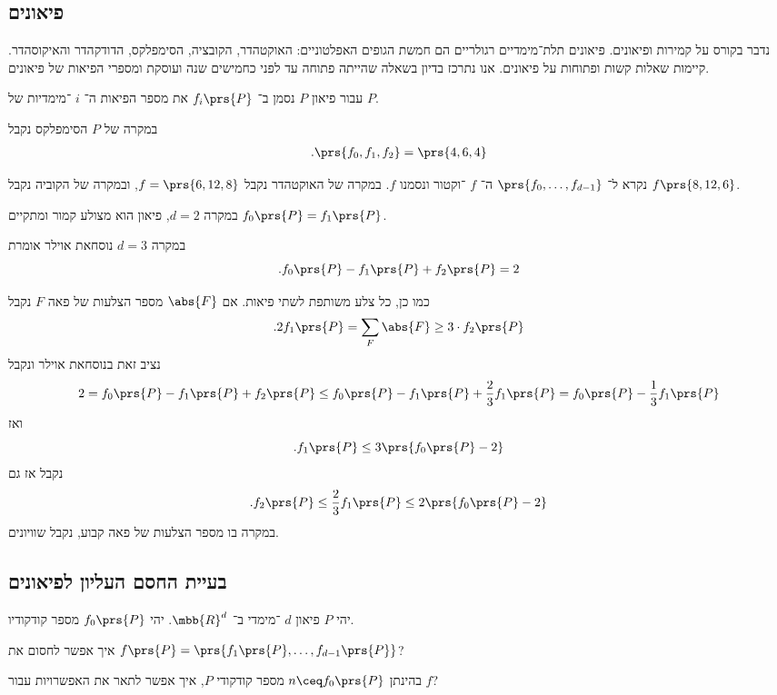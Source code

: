 \documentclass[a4paper,10pt,twoside,openany]{book}
\begin{document}
\subsection{פיאונים}

נדבר בקורס על קמירות ופיאונים.
פיאונים תלת־מימדיים רגולריים הם חמשת הגופים האפלטוניים: האוקטהדר, הקובציה, הסימפלקס, הדודקהדר והאיקוסהדר.
קיימות שאלות קשות ופתוחות על פיאונים. אנו נתרכז בדיון בשאלה שהייתה פתוחה עד לפני כחמישים שנה ועוסקת ומספרי הפיאות של פיאונים.

עבור פיאון
$P$
נסמן ב־%
$f_i\prs{P}$
את מספר הפיאות ה־%
$i$%
־מימדיות של
$P$.

במקרה של
$P$
הסימפלקס נקבל
\begin{align*}
\text{.} \prs{f_0, f_1, f_2} = \prs{4,6,4}
\end{align*}

נקרא ל־%
$\prs{f_0, \ldots, f_{d-1}}$
ה־%
$f$%
־וקטור ונסמנו
$f$.
במקרה של האוקטהדר נקבל
$f = \prs{6,12,8}$,
ובמקרה של הקוביה נקבל
$f\prs{8,12,6}$.

במקרה
$d = 2$,
פיאון הוא מצולע קמור ומתקיים
$f_0\prs{P} = f_1\prs{P}$.

במקרה
$d = 3$
נוסחאת אוילר אומרת
\[\text{.} f_0\prs{P} - f_1\prs{P} + f_2\prs{P} = 2\]

כמו כן, כל צלע משותפת לשתי פיאות. אם
$\abs{F}$
מספר הצלעות של פאה
$F$
נקבל
\begin{align*}
\text{.} 2 f_1\prs{P} = \sum_{F} \abs{F} \geq 3 \cdot f_2\prs{P}
\end{align*}
נציב זאת בנוסחאת אוילר ונקבל
\[2 = f_0\prs{P} - f_1\prs{P} + f_2\prs{P} \leq f_0\prs{P} - f_1\prs{P} + \frac{2}{3} f_1\prs{P} = f_0\prs{P} - \frac{1}{3} f_1\prs{P}\]
ואז
\[\text{.} f_1\prs{P} \leq 3 \prs{f_0\prs{P} - 2}\]
נקבל אז גם
\[\text{.} f_2\prs{P} \leq \frac{2}{3} f_1\prs{P} \leq 2 \prs{f_0\prs{P} - 2}\]
במקרה בו מספר הצלעות של פאה קבוע, נקבל שוויונים.

\subsection{בעיית החסם העליון לפיאונים}

יהי
$P$
פיאון
$d$%
־מימדי ב־%
$\mbb{R}^d$.
יהי
$f_0\prs{P}$
מספר קודקודיו.

\begin{question}
איך אפשר לחסום את
$f\prs{P} = \prs{f_1\prs{P}, \ldots, f_{d-1}\prs{P}}$?
\end{question}

\begin{question}
בהינתן
$n \ceq f_0\prs{P}$
מספר קודקודי
$P$,
איך אפשר לתאר את האפשרויות עבור
$f$?
\end{question}
\end{document}
